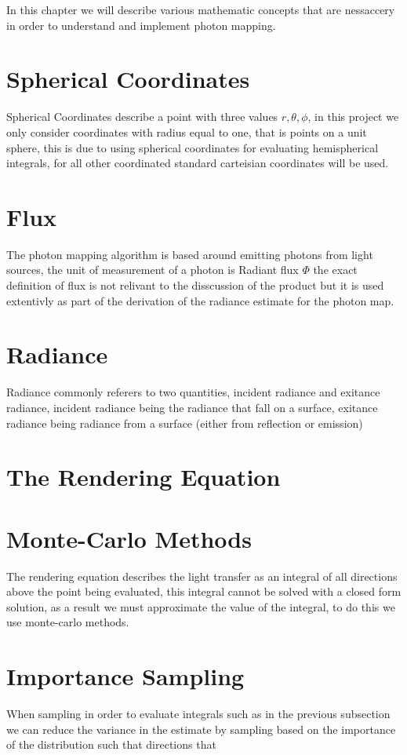 In this chapter we will describe various mathematic concepts that are nessaccery in order to understand and implement photon mapping.

\section{Spherical Coordinates}
Spherical Coordinates describe a point with three values $r, \theta, \phi$, in this project we only consider coordinates with
radius equal to one, that is points on a unit sphere, this is due to using spherical coordinates for evaluating hemispherical
integrals, for all other coordinated standard carteisian coordinates will be used.


\section{Flux}
The photon mapping algorithm is based around emitting photons from light sources, the unit of measurement of a photon is
Radiant flux $\Phi$ the exact definition of flux is not relivant to the disscussion of the product but it is used extentivly
as part of the derivation of the radiance estimate for the photon map.

\section{Radiance}
Radiance commonly referers to two quantities, incident radiance and exitance radiance, incident radiance being the radiance
that fall on a surface, exitance radiance being radiance from a surface (either from reflection or emission)

\section{The Rendering Equation}

\section{Monte-Carlo Methods}
The rendering equation describes the light transfer as an integral of all directions above the point being evaluated, this
integral cannot be solved with a closed form solution, as a result we must approximate the value of the integral, to do this
we use monte-carlo methods. 

\section{Importance Sampling}
When sampling in order to evaluate integrals such as in the previous subsection we can reduce the variance in the estimate by
sampling based on the importance of the distribution such that directions that 

